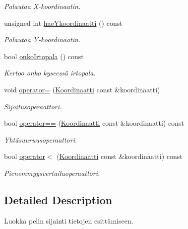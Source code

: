 \begin{DoxyCompactItemize}
\begin{DoxyCompactList}\small\item\em Palautaa X-\/koordinaatin. \end{DoxyCompactList}\item 
unsigned int \hyperlink{class_julkinen_1_1_koordinaatti_ae3a0a3a5e26abb272fe30ad4b93dc877}{hae\+Ykoordinaatti} () const 
\begin{DoxyCompactList}\small\item\em Palautaa Y-\/koordinaatin. \end{DoxyCompactList}\item 
bool \hyperlink{class_julkinen_1_1_koordinaatti_ab899c7324a877d548d8a56fa72c23215}{onko\+Irtopala} () const 
\begin{DoxyCompactList}\small\item\em Kertoo onko kyseessä irtopala. \end{DoxyCompactList}\item 
void \hyperlink{class_julkinen_1_1_koordinaatti_a272385b2697ff7103c10fc0fd803db8a}{operator=} (\hyperlink{class_julkinen_1_1_koordinaatti}{Koordinaatti} const \&koordinaatti)
\begin{DoxyCompactList}\small\item\em Sijoitusoperaattori. \end{DoxyCompactList}\item 
bool \hyperlink{class_julkinen_1_1_koordinaatti_af11091ff70b93768ddb1490767ccb222}{operator==} (\hyperlink{class_julkinen_1_1_koordinaatti}{Koordinaatti} const \&koordinaatti) const 
\begin{DoxyCompactList}\small\item\em Yhtäsuuruusoperaattori. \end{DoxyCompactList}\item 
bool \hyperlink{class_julkinen_1_1_koordinaatti_a0dc3f61b2c006ac687deb92a0b89867c}{operator$<$} (\hyperlink{class_julkinen_1_1_koordinaatti}{Koordinaatti} const \&koordinaatti) const 
\begin{DoxyCompactList}\small\item\em Pienemmyysvertailuoperaattori. \end{DoxyCompactList}\end{DoxyCompactItemize}


\subsection{Detailed Description}
Luokka pelin sijainti tietojen esittämiseen. 

